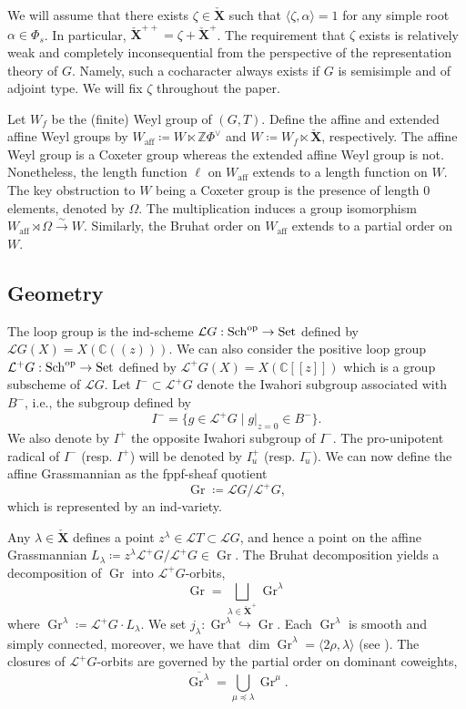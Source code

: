 \documentclass{amsart}
\newcommand{\C}{\mathbb{C}}
\newcommand{\Z}{\mathbb{Z}}
\renewcommand{\L}{\mathcal{L}}
\DeclareMathOperator{\Sch}{Sch}
\newcommand{\bfXv}{\check{\mathbf{X}}}
\DeclareMathOperator{\Gr}{Gr}
\DeclareMathOperator{\op}{op}
\DeclareMathOperator{\aff}{aff}
\theoremstyle{definition}
\begin{document}
    We will assume that there exists $\zeta \in \bfXv$ such that $\langle \zeta, \alpha \rangle = 1$ for any simple root $\alpha \in \Phi_s$. In particular, $\bfXv^{++} = \zeta + \bfXv^+$.
    The requirement that $\zeta$ exists is relatively weak and completely inconsequential from the perspective of the representation theory of $G$.
    Namely, such a cocharacter always exists if $G$ is semisimple and of adjoint type. We will fix $\zeta$ throughout the paper.

    Let $W_f$ be the (finite) Weyl group of $(G,T)$. Define the affine and extended affine Weyl groups by $W_{\aff} \coloneq W \ltimes \Z \Phi^{\vee}$ and $W \coloneq W_f \ltimes \bfXv$, respectively.
    The affine Weyl group is a Coxeter group whereas the extended affine Weyl group is not. 
    Nonetheless, the length function $\ell$ on $W_{\aff}$ extends to a length function on $W$.
    The key obstruction to $W$ being a Coxeter group is the presence of length 0 elements, denoted by $\Omega$.
    The multiplication induces a group isomorphism $W_{\aff} \rtimes \Omega \stackrel{\sim}{\to} W$.
    Similarly, the Bruhat order on $W_{\aff}$ extends to a partial order on $W$.

    \subsection{Geometry}

    The loop group is the ind-scheme $\L G : \Sch^{\op} \to \textnormal{Set}$ defined by $\L G (X) = X (\C((z)))$.
    We can also consider the positive loop group $\L^+ G : \Sch^{\op} \to \textnormal{Set}$ defined by $\L^+ G (X) = X (\C[[z]])$ which is a group subscheme of $\L G$.
    Let $I^{-} \subset \L^+ G$ denote the Iwahori subgroup associated with $B^{-}$, i.e., the subgroup defined by
    \[I^{-}  = \{g \in \L^+ G \mid g\vert_{z=0} \in B^{-} \}. \]
    We also denote by $I^+$ the opposite Iwahori subgroup of $I^{-}$. The pro-unipotent radical of $I^{-}$ (resp. $I^{+}$) will be denoted by $I_u^+$ (resp. $I_u^-$).
    We can now define the affine Grassmannian as the fppf-sheaf quotient
    \[\Gr \coloneq \L G/\L^+ G,\]
    which is represented by an ind-variety.
    
    Any $\lambda \in \bfXv$ defines a point $z^{\lambda} \in \L T \subset \L G$, and hence a point on the affine Grassmannian $L_{\lambda} \coloneq z^{\lambda} \L^ +G / \L^+ G \in \Gr$.
    The Bruhat decomposition yields a decomposition of $\Gr$ into $\L^+ G$-orbits,
    \[\Gr = \bigsqcup_{\lambda \in \bfXv^{+}} \Gr^{\lambda}\]
    where $\Gr^{\lambda} \coloneq \L^+ G \cdot L_{\lambda}$.
    We set $j_{\lambda} : \Gr^{\lambda} \hookrightarrow \Gr$.
    Each $\Gr^{\lambda}$ is smooth and simply connected, moreover, we have that $\dim \Gr^{\lambda} = \langle 2\rho, \lambda \rangle$ (see \cite{Lu1}).
    The closures of $\L^+ G$-orbits are governed by the partial order on dominant coweights,
    \[\overline{\Gr^{\lambda}} = \bigcup_{\mu \preceq \lambda} \Gr^{\mu}.\]
\end{document}
